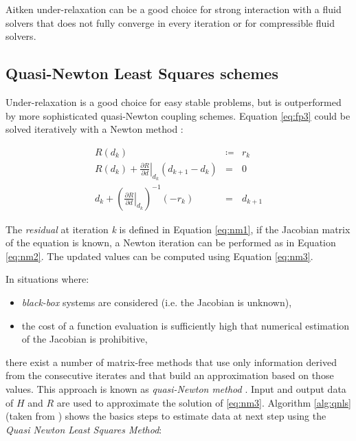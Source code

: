 Aitken under-relaxation can be a good choice for strong interaction with a fluid solvers that does not fully converge in every iteration or for compressible fluid solvers.


\subsection{Quasi-Newton Least Squares schemes}

Under-relaxation is a good choice for easy stable problems, but is outperformed by more sophisticated quasi-Newton coupling schemes. Equation \ref{eq:fp3} could be solved iteratively with a Newton method \cite{uekermann2016partitioned}:

\begin{subequations}
	\begin{eqnarray}
		\label{eq:nm1}
		R(d_k) &\coloneqq&  r_k  \\
		\label{eq:nm2}
		R(d_k) + \left. \frac{\partial R}{\partial d}\right|_{d_k} \left( d_{k+1} - d_k \right) &=& 0 \\
		\label{eq:nm3}
		d_k + \left(  \left. \frac{\partial R}{\partial d} \right|_{d_k} \right)^{-1} \left(-r_k \right) &=&  d_{k+1}
	\end{eqnarray} 
	\label{eq:fp-jac}
\end{subequations}

The \textit{residual} at iteration \textit{k} is defined in Equation \ref{eq:nm1}, if the Jacobian matrix of the equation is known, a Newton iteration can be performed as in Equation \ref{eq:nm2}. The updated values can be computed using Equation \ref{eq:nm3}.

In situations where:
\begin{itemize}
	\item \textit{black-box} systems are considered (i.e. the Jacobian is unknown),
	\item the cost of a function evaluation is sufficiently high that numerical estimation of the Jacobian is prohibitive, 
\end{itemize}

there exist a number of matrix-free methods that use only information derived from the consecutive iterates and that build an approximation based on those values. This approach is known as \textit{quasi-Newton method} \cite{haelterman2009quasi}.
Input and output data of $H$ and $R$ are used to approximate the solution of \ref{eq:nm3}. Algorithm \ref{alg:qnls} (taken from \cite{uekermann2013parallel}) shows the basics steps to estimate data at next step using the \textit{Quasi Newton Least Squares Method}:

